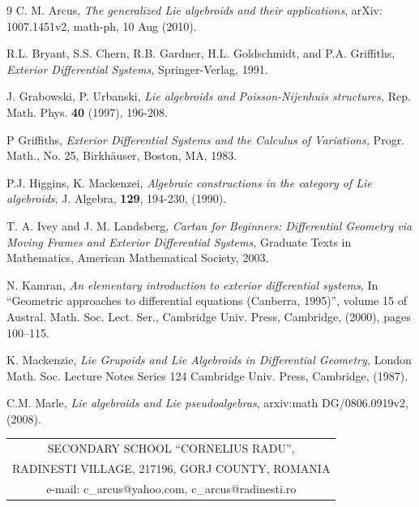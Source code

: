 \documentclass[11pt]{article}
\begin{document}

\begin{thebibliography}{9}
 C. M. Arcus, \emph{The generalized Lie algebroids and their
applications}, arXiv: 1007.1451v2, math-ph, 10 Aug (2010).

 R.L. Bryant, S.S. Chern, R.B. Gardner, H.L. Goldschmidt, and
P.A. Griffiths, \emph{Exterior Differential Systems,} Springer-Verlag, 1991.

 J. Grabowski, P. Urbanski, \emph{Lie algebroids and
Poisson-Nijenhuis structures,} Rep. Math. Phys. \textbf{40} (1997), 196-208.

 P Griffiths, \emph{Exterior Differential Systems and the
Calculus of Variations,} Progr. Math., No. 25, Birkh\"{a}user, Boston, MA,
1983.

 P.J. Higgins, K. Mackenzei, \emph{Algebraic constructions in the
category of Lie algebroids}, J. Algebra, \textbf{129}, 194-230, (1990).

 T. A. Ivey and J. M. Landsberg, \emph{Cartan for Beginners:
Differential Geometry via Moving Frames and Exterior Differential Systems,}
Graduate Texts in Mathematics, American Mathematical Society, 2003.

 N. Kamran, \emph{An elementary introduction to exterior
differential systems,} In \textquotedblleft Geometric approaches to
differential equations (Canberra, 1995)\textquotedblright , volume 15 of
Austral. Math. Soc. Lect. Ser., Cambridge Univ. Press, Cambridge, (2000),
pages 100--115.

 K. Mackenzie, \emph{Lie Grupoids and Lie Algebroids in
Differential Geometry,} London Math. Soc. Lecture Notes Series 124 Cambridge
Univ. Press, Cambridge, (1987).

 C.M. Marle, \emph{Lie algebroids and Lie pseudoalgebras},
arxiv:math DG/0806.0919v2, (2008).
\end{thebibliography}

\bigskip

\bigskip

\hfill%
\begin{tabular}{c}
SECONDARY SCHOOL \textquotedblleft CORNELIUS RADU\textquotedblright, \\
RADINESTI VILLAGE, 217196, GORJ COUNTY, ROMANIA \\
e-mail: c\_arcus@yahoo.com, c\_arcus@radinesti.ro%
\end{tabular}
\end{document}
